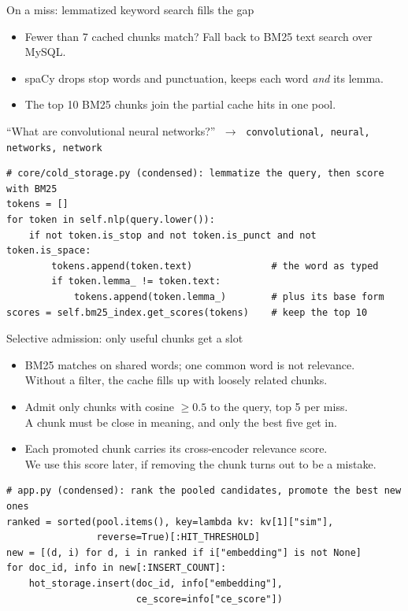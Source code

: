 \documentclass[aspectratio=169,11pt]{beamer}
\newcommand{\say}[1]{\\ {\footnotesize\color{cmgrey}#1}}
\begin{document}
\begin{frame}[fragile]{On a miss: lemmatized keyword search fills the gap}
\begin{itemize}
  \setlength{\itemsep}{3pt}
  \item Fewer than 7 cached chunks match? Fall back to BM25 text search over MySQL.
  \item spaCy drops stop words and punctuation, keeps each word \emph{and} its lemma.
  \item The top 10 BM25 chunks join the partial cache hits in one pool.
\end{itemize}
\vspace{3pt}
{\small
``What are convolutional neural networks?''
$\;\rightarrow\;$
\texttt{convolutional, neural, networks, network}\par}
\vspace{1pt}
\begin{lstlisting}
# core/cold_storage.py (condensed): lemmatize the query, then score with BM25
tokens = []
for token in self.nlp(query.lower()):
    if not token.is_stop and not token.is_punct and not token.is_space:
        tokens.append(token.text)              # the word as typed
        if token.lemma_ != token.text:
            tokens.append(token.lemma_)        # plus its base form
scores = self.bm25_index.get_scores(tokens)    # keep the top 10
\end{lstlisting}
\end{frame}

\begin{frame}[fragile]{Selective admission: only useful chunks get a slot}
\begin{itemize}
  \setlength{\itemsep}{3pt}
  \item BM25 matches on shared words; one common word is not relevance.
        \say{Without a filter, the cache fills up with loosely related chunks.}
  \item Admit only chunks with cosine $\geq 0.5$ to the query, top 5 per miss.
        \say{A chunk must be close in meaning, and only the best five get in.}
  \item Each promoted chunk carries its cross-encoder relevance score.
        \say{We use this score later, if removing the chunk turns out to be a mistake.}
\end{itemize}
\vspace{2pt}
\begin{lstlisting}
# app.py (condensed): rank the pooled candidates, promote the best new ones
ranked = sorted(pool.items(), key=lambda kv: kv[1]["sim"],
                reverse=True)[:HIT_THRESHOLD]
new = [(d, i) for d, i in ranked if i["embedding"] is not None]
for doc_id, info in new[:INSERT_COUNT]:
    hot_storage.insert(doc_id, info["embedding"],
                       ce_score=info["ce_score"])
\end{lstlisting}
\end{frame}
\end{document}
